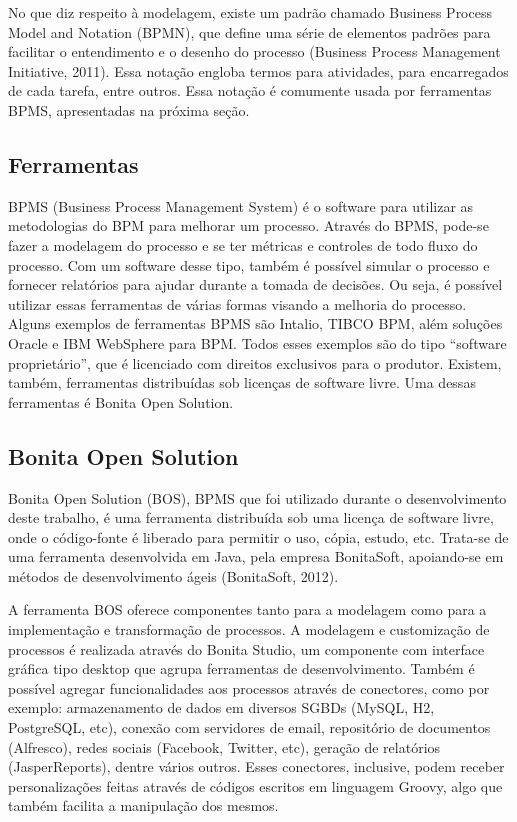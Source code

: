 \documentclass[12pt]{article}
\begin{document}
	No que diz respeito à modelagem, existe um padrão chamado Business Process Model and Notation (BPMN), que define  uma série de elementos padrões para facilitar o entendimento e o desenho do processo (Business Process Management Initiative, 2011). Essa notação engloba termos para atividades, para encarregados de cada tarefa, entre outros. Essa notação é comumente usada por ferramentas BPMS, apresentadas na próxima seção.

\subsection{Ferramentas}

BPMS (Business Process Management System) é o software para utilizar as metodologias do BPM para melhorar um processo. Através do BPMS, pode-se fazer a modelagem do processo e se ter métricas e controles de todo fluxo do processo. Com um software desse tipo, também é possível simular o processo e fornecer relatórios para ajudar durante a tomada de decisões. Ou seja, é possível utilizar essas ferramentas de várias formas visando a melhoria do processo. Alguns exemplos de ferramentas BPMS são Intalio, TIBCO BPM, além soluções Oracle e IBM WebSphere para BPM. Todos esses exemplos são do tipo “software proprietário”, que é licenciado com direitos exclusivos para o produtor. Existem, também, ferramentas distribuídas sob licenças de software livre. Uma dessas ferramentas é Bonita Open Solution.

\subsection{Bonita Open Solution}

Bonita Open Solution (BOS), BPMS que foi utilizado durante o desenvolvimento deste trabalho, é uma ferramenta distribuída sob uma licença de software livre, onde o código-fonte é liberado para permitir o uso, cópia, estudo, etc. Trata-se de uma ferramenta desenvolvida em Java, pela empresa BonitaSoft, apoiando-se em métodos de desenvolvimento ágeis (BonitaSoft, 2012).

A ferramenta BOS oferece componentes tanto para a modelagem como para a implementação e transformação de processos. A modelagem e customização de processos é realizada através do Bonita Studio, um componente com interface gráfica tipo desktop que agrupa ferramentas de desenvolvimento. Também é possível agregar funcionalidades aos processos através de conectores, como por exemplo: armazenamento de dados em diversos SGBDs (MySQL, H2, PostgreSQL, etc), conexão com servidores de email, repositório de documentos (Alfresco), redes sociais (Facebook, Twitter, etc), geração de relatórios (JasperReports), dentre vários outros. Esses conectores, inclusive, podem receber personalizações feitas através de códigos escritos em linguagem Groovy, algo que também facilita a manipulação dos mesmos.
\end{document}
